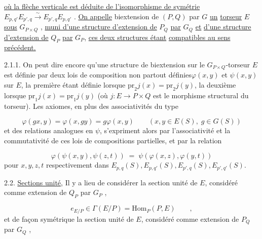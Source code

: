 \underline{où la flèche verticale est déduite de l'isomorphisme de symétrie}
$E_{p,q'}E_{p',q} \overset{\sim}{\longrightarrow} E_{p',q}E_{p,q'}$ . \underline{On appelle} biextension de $(P,Q)$ par $G$ \underline{un}
\underline{torseur} $E$ \underline{sous} $G_{P\times Q}$ , \underline{muni d'une structure d'extension de} $P_Q$ \underline{par} $G_Q$ \underline{et}
\underline{d'une structure d'extension de} $Q_P$ \underline{par} $G_P$, \underline{ces deux structures étant}
\underline{compatibles au sens précédent.}



2.1.1.  On peut dire encore qu'une structure de biextension sur le
$G_{P\times Q}$-torseur $E$ est définie par deux lois de composition non partout définies$\varphi(x,y)$ et $\psi(x,y)$ sur $E$, la première étant définie lorsque
$\mathrm{pr}_2 j(x) = \mathrm{pr}_2 j(y)$, la deuxième lorsque $\mathrm{pr}_1 j(x) = \mathrm{pr}_1 j(y)$ (où $j : E \to P\times Q$
est le morphisme structural du torseur). Les axiomes, en plus des associativités du type

\begin{equation}\tag{2.1.1.1}
\varphi(gx,y) = \varphi(x,gy) = g\varphi(x,y) \qquad (x,y \in E(S), \; g \in G(S))
\end{equation}
et des relations analogues en $\psi$, s'expriment alors par l'associativité
et la commutativité de ces lois de compositions partielles, et par la
relation

\begin{equation}\tag{2.1.1.2}
\varphi(\psi(x,y),\psi(z,t)) \;=\; \psi(\varphi(x,z),\varphi(y,t))
\end{equation}
pour $x,y,z,t$ respectivement dans $E_{p,q}(S),E_{p,q'}(S),E_{p',q}(S),E_{p',q'}(S)$.

2.2.  \underline{Sections unité}, Il y a lieu de considérer la section unité de $E$,
considéré comme extension de $Q_P$ par $G_P$ ,

\begin{equation}\tag{2.2.1}
e_{E/P} \in \Gamma(E/P) = \mathrm{Hom}_P(P,E) \qquad ,
\end{equation}
et de façon symétrique la section unité de $E$, considéré comme extension
de $P_Q$ par $G_Q$ ,

